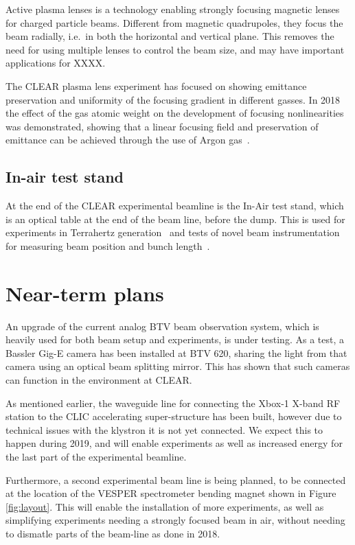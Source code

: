 \documentclass[a4paper,
               keeplastbox,   %
               ]{jacow}
\begin{document}
Active plasma lenses is a technology enabling strongly focusing magnetic lenses for charged particle beams.
Different from magnetic quadrupoles, they focus the beam radially, i.e.\ in both the horizontal and vertical plane.
This removes the need for using multiple lenses to control the beam size, and may have important applications for XXXX.

The CLEAR plasma lens experiment has focused on showing emittance preservation and uniformity of the focusing gradient in different gasses.
In 2018 the effect of the gas atomic weight on the development of focusing nonlinearities was demonstrated, showing that a linear focusing field and preservation of emittance can be achieved through the use of Argon gas~\cite{CarlPRL}.


\subsection{In-air test stand}

At the end of the CLEAR experimental beamline is the In-Air test stand, which is an optical table at the end of the beam line, before the dump.
This is used for experiments in Terrahertz generation~\cite{CurcioPRAB} and tests of novel beam instrumentation for measuring beam position and bunch length~\cite{Thibaut::CLEARrev}.

\section{Near-term plans}

An upgrade of the current analog BTV beam observation system, which is heavily used for both beam setup and experiments, is under testing.
As a test, a Bassler Gig-E camera has been installed at BTV 620, sharing the light from that camera using an optical beam splitting mirror.
This has shown that such cameras can function in the environment at CLEAR.

As mentioned earlier, the waveguide line for connecting the Xbox-1 X-band RF station to the CLIC accelerating super-structure has been built, however due to technical issues with the klystron it is not yet connected.
We expect this to happen during 2019, and will enable experiments  as well as increased energy for the last part of the experimental beamline.

Furthermore, a second experimental beam line is being planned, to be connected at the location of the VESPER spectrometer bending magnet shown in Figure \ref{fig:layout}.
This will enable the installation of more experiments, as well as simplifying experiments needing a strongly focused beam in air, without needing to dismatle parts of the beam-line as done in 2018.
\end{document}
